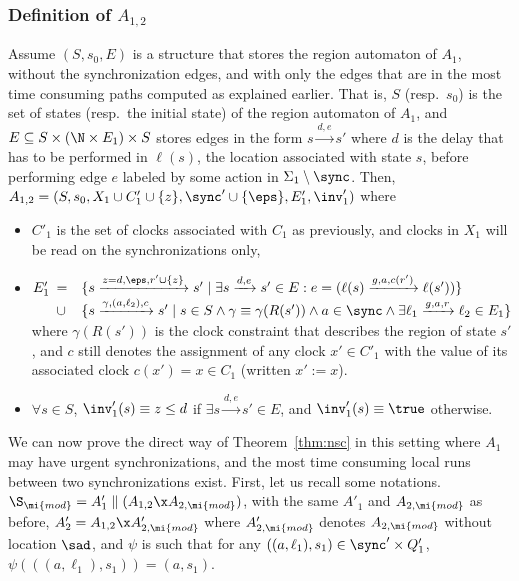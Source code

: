 \documentclass{LMCS}
\theoremstyle{plain}\newtheorem*{prop11}{Proposition~\ref{prop:states} bis}
\begin{document}
\subsubsection*{Definition of $A_{1,2}$}
Assume $(S,s_0,E)$ is a structure that
stores the region automaton of $A_1$, without the synchronization edges,
and with only the edges that are in the most time consuming paths computed as explained earlier.
That is, $S$ (resp.\ $s_0$) is the set of states (resp.\ the initial state)
of the region automaton of $A_1$, and
$E\subseteq S\times(\N\times E_1)\times S$
stores edges in the form \mbox{$s\xrightarrow{d,e}s'$}
where $d$ is the delay that has to be performed in $\ell(s)$, the location
associated with state $s$, before performing edge $e$ labeled by some
action in $\Sigma_1\setminus\sync$.
Then, $A_{1,2}=(S,s_0,X_1\cup C'_1\cup\{z\},\sync'\cup\{\eps\},E'_1,\inv'_1)$ where
\begin{itemize}
  \item $C'_1$ is the set of clocks associated with $C_1$ as previously,
  and clocks in $X_1$ will be read on the synchronizations only,
  \item $E'_1
  \begin{array}[t]{ll}
    =&\{s\xrightarrow{z=d,\eps,r'\cup\{z\}}s'\mid \exists
    s\xrightarrow{d,e}s'\in E: e=(\ell(s)\xrightarrow{g,a,c(r')}\ell(s'))\}\\
    \cup&\{s\xrightarrow{\gamma,(a,\ell_2),c}s'\mid
    s \in S \land \gamma\equiv\gamma(R(s'))
    \land a \in\sync \land \exists\ell_1\xrightarrow{g,a,r}\ell_2\in E_1\}
  \end{array}$\\ where $\gamma(R(s'))$ is the clock constraint that describes the region of state $s'$,
  and
  $c$ still denotes the assignment of any clock $x'\in C'_1$
  with the value of its associated clock $c(x')=x\in C_1$ (written $x':=x$).
  \item $\forall s\in S$, $\inv'_1(s)\equiv z\leq d$ if $\exists s\xrightarrow{d,e}s'\in E$,
  and $\inv'_1(s)\equiv \true$ otherwise.
\end{itemize}



We can now prove the direct way of Theorem~\ref{thm:nsc} in this setting
where $A_1$ may have urgent synchronizations, and the most time consuming
local runs between two synchronizations exist.
First, let us recall some notations.
$\S_\mi{mod}=A'_1\parallel (A_{1,2}\x A_{2,\mi{mod}})$, with the same
$A'_1$ and $A_{2,\mi{mod}}$ as before,
$A'_2=A_{1,2}\x A'_{2,\mi{mod}}$ where $A'_{2,\mi{mod}}$ denotes
$A_{2,\mi{mod}}$ without location $\sad$,
and $\psi$ is such that for any
$((a,\ell_1),s_1)\in \sync'\times Q'_1$, $\psi(((a,\ell_1),s_1))=(a,s_1)$.
\hfill
\end{document}
